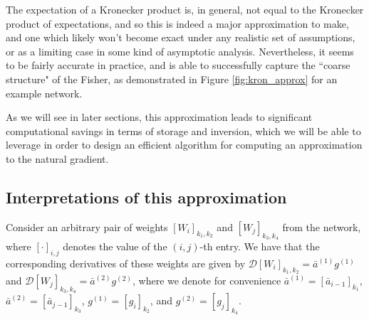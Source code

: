 \documentclass[12pt]{article}
\newcommand{\deriv}{\mathcal{D}}
\begin{document}
The expectation of a Kronecker product is, in general, not equal to the Kronecker product of expectations, and so this is indeed a major approximation to make, and one which likely won't become exact under any realistic set of assumptions, or as a limiting case in some kind of asymptotic analysis.  Nevertheless, it seems to be fairly accurate in practice, and is able to successfully capture the ``coarse structure" of the Fisher, as demonstrated in Figure \ref{fig:kron_approx} for an example network.

As we will see in later sections, this approximation leads to significant computational savings in terms of storage and inversion, which we will be able to leverage in order to design an efficient algorithm for computing an approximation to the natural gradient.  %


\subsection{Interpretations of this approximation}
\label{sec:justifying_approx}

Consider an arbitrary pair of weights $[W_i]_{k_1,k_2}$ and $[W_j]_{k_3,k_4}$ from the network, where $[\cdot]_{i,j}$ denotes the value of the $(i,j)$-th entry.  We have that the corresponding derivatives of these weights are given by $\deriv [W_i]_{k_1,k_2} = \bar{a}^{(1)} g^{(1)}$ and $\deriv [W_j]_{k_3,k_4} = \bar{a}^{(2)} g^{(2)}$, where we denote for convenience $\bar{a}^{(1)} = [\bar{a}_{i-1}]_{k_1}$, $\bar{a}^{(2)} = [\bar{a}_{j-1}]_{k_3}$, $g^{(1)} = [g_i]_{k_2}$, and $g^{(2)} = [g_j]_{k_4}$.
\end{document}
